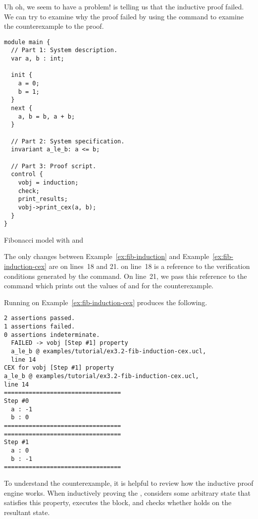 Uh oh, we seem to have a problem! \uclid{} is telling us that the inductive proof failed. We can try to examine why the proof failed by using the  command to examine the counterexample to the proof.


\begin{uclidlisting}[htbp]
\begin{lstlisting}[language=uclid,style=uclidstyle]
module main {
  // Part 1: System description.
  var a, b : int;

  init {
    a = 0;
    b = 1;
  }
  next {
    a, b = b, a + b;
  }

  // Part 2: System specification.
  invariant a_le_b: a <= b;

  // Part 3: Proof script.
  control {
    vobj = induction;
    check;
    print_results;
    vobj->print_cex(a, b);
  }
}
\end{lstlisting}
\caption{\uclid{} Fibonacci model with  and }
\label{ex:fib-induction-cex}
\end{uclidlisting}

The only changes between Example~\ref{ex:fib-induction} and Example~\ref{ex:fib-induction-cex} are on lines~18 and 21.  on line~18 is a reference to the verification conditions generated by the  command. On line~21, we pass this reference to the  command which prints out the values of  and  for the counterexample.

Running \uclid{} on Example~\ref{ex:fib-induction-cex} produces the following.

\begin{Verbatim}[frame=single, samepage=true]
2 assertions passed.
1 assertions failed.
0 assertions indeterminate.
  FAILED -> vobj [Step #1] property 
  a_le_b @ examples/tutorial/ex3.2-fib-induction-cex.ucl, 
  line 14
CEX for vobj [Step #1] property 
a_le_b @ examples/tutorial/ex3.2-fib-induction-cex.ucl, 
line 14
=================================
Step #0
  a : -1
  b : 0
=================================
=================================
Step #1
  a : 0
  b : -1
=================================
\end{Verbatim}

To understand the counterexample, it is helpful to review how the inductive proof engine works. When inductively proving the  , \uclid{} considers some arbitrary state that satisfies this property, executes the  block, and checks whether  holds on the resultant state.

